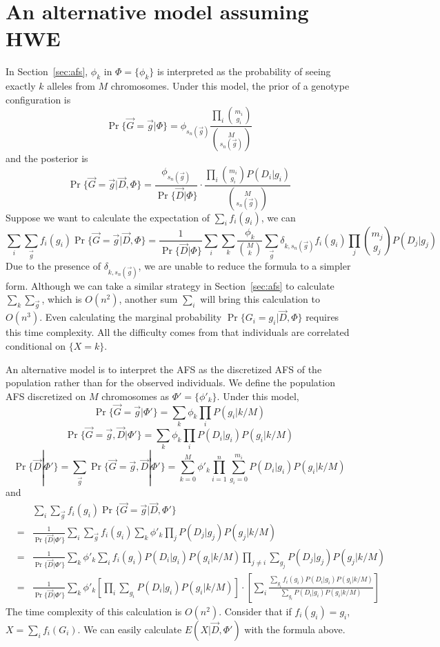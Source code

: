 \documentclass[pdftex,10pt]{book}
\begin{document}
\section{An alternative model assuming HWE}
In Section~\ref{sec:afs}, $\phi_k$ in $\Phi=\{\phi_k\}$ is interpreted
as the probability of seeing exactly $k$ alleles from $M$
chromosomes. Under this model, the prior of a genotype configuration is
$$
\Pr\{\vec{G}=\vec{g}|\Phi\}=\phi_{s_n(\vec{g})}\frac{\prod_i\binom{m_i}{g_i}}{\binom{M}{s_n(\vec{g})}}
$$
and the posterior is
$$
\Pr\{\vec{G}=\vec{g}|\vec{D},\Phi\}=\frac{\phi_{s_n(\vec{g})}}{\Pr\{\vec{D}|\Phi\}}\cdot\frac{\prod_i\binom{m_i}{g_i}P(D_i|g_i)}{\binom{M}{s_n(\vec{g})}}
$$
Suppose we want to calculate the expectation of $\sum_if_i(g_i)$, we can
$$
\sum_i\sum_{\vec{g}}f_i(g_i)\Pr\{\vec{G}=\vec{g}|\vec{D},\Phi\}
=\frac{1}{\Pr\{\vec{D}|\Phi\}}\sum_i\sum_k\frac{\phi_k}{\binom{M}{k}}\sum_{\vec{g}}\delta_{k,s_n(\vec{g})}f_i(g_i)\prod_j\binom{m_j}{g_j}P(D_j|g_j)
$$
Due to the presence of $\delta_{k,s_n(\vec{g})}$, we are unable to
reduce the formula to a simpler form. Although we can take a similar
strategy in Section~\ref{sec:afs} to calculate $\sum_k\sum_{\vec{g}}$,
which is $O(n^2)$, another sum $\sum_i$ will bring this calculation to
$O(n^3)$. Even calculating the marginal probability
$\Pr\{G_i=g_i|\vec{D},\Phi\}$ requires this time complexity. All the
difficulty comes from that individuals are correlated conditional on
$\{X=k\}$.

An alternative model is to interpret the AFS as the discretized AFS of
the population rather than for the observed individuals. We define the
population AFS discretized on $M$ chromosomes as
$\Phi'=\{\phi'_k\}$. Under this model,
$$
\Pr\{\vec{G}=\vec{g}|\Phi'\}=\sum_k\phi_k\prod_iP(g_i|k/M)
$$
$$
\Pr\{\vec{G}=\vec{g},\vec{D}|\Phi'\}=\sum_k\phi_k\prod_iP(D_i|g_i)P(g_i|k/M)
$$
$$
\Pr\{\vec{D}|\Phi'\}=\sum_{\vec{g}}\Pr\{\vec{G}=\vec{g},\vec{D}|\Phi'\}
=\sum_{k=0}^M\phi'_k\prod_{i=1}^n\sum_{g_i=0}^{m_i}P(D_i|g_i)P(g_i|k/M)
$$
and
\begin{eqnarray}\label{equ:fexp}
&&\sum_i\sum_{\vec{g}}f_i(g_i)\Pr\{\vec{G}=\vec{g}|\vec{D},\Phi'\}\\\nonumber
&=&\frac{1}{\Pr\{\vec{D}|\Phi'\}}\sum_i\sum_{\vec{g}}f_i(g_i)\sum_k\phi'_k\prod_jP(D_j|g_j)P(g_j|k/M)\\\nonumber
&=&\frac{1}{\Pr\{\vec{D}|\Phi'\}}\sum_k\phi'_k\sum_if_i(g_i)P(D_i|g_i)P(g_i|k/M)\prod_{j\not=i}\sum_{g_j}P(D_j|g_j)P(g_j|k/M)\\\nonumber
&=&\frac{1}{\Pr\{\vec{D}|\Phi'\}}\sum_k\phi'_k\left[\prod_i\sum_{g_i}P(D_i|g_i)P(g_i|k/M)\right]\cdot\left[\sum_i\frac{\sum_{g_i}f_i(g_i)P(D_i|g_i)P(g_i|k/M)}{\sum_{g_i}P(D_i|g_i)P(g_i|k/M)}\right]
\end{eqnarray}
The time complexity of this calculation is $O(n^2)$. Consider that if
$f_i(g_i)=g_i$, $X=\sum_if_i(G_i)$. We can easily calculate
$E(X|\vec{D},\Phi')$ with the formula above.
\end{document}
